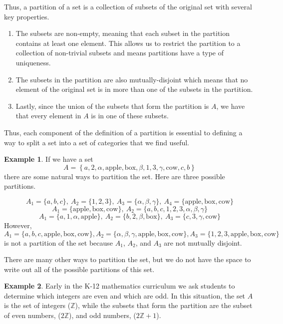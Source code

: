 \documentclass[
]{book}
\theoremstyle{definition}
\theoremstyle{definition}
\newtheorem{example}{Example}[chapter]
\theoremstyle{definition}
\theoremstyle{definition}
\theoremstyle{remark}
\begin{document}
Thus, a partition of a set is a collection of subsets of the original set with several key properties.

\begin{enumerate}
\def\labelenumi{\arabic{enumi}.}
\item
  The subsets are non-empty, meaning that each subset in the partition contains at least one element. This allows us to restrict the partition to a collection of non-trivial subsets and means partitions have a type of uniqueness.
\item
  The subsets in the partition are also mutually-disjoint which means that no element of the original set is in more than one of the subsets in the partition.
\item
  Lastly, since the union of the subsets that form the partition is \(A\), we have that every element in \(A\) is in one of these subsets.
\end{enumerate}

Thus, each component of the definition of a partition is essential to defining a way to split a set into a set of categories that we find useful.

\begin{example}
If we have a set
\[A=\left\{ a, 2, \alpha , \mbox{apple} , \mbox{box}, \beta, 1, 3, \gamma , \mbox{cow}, c, b \right\}\] there are some natural ways to partition the set. Here are three possible partitions.

\[A_1 = \{a,b,c\}, \: A_2 = \{1,2,3\},\: A_3 = \{\alpha, \beta, \gamma\}, \: A_4 = \{\mbox{apple} , \mbox{box}, \mbox{cow}\}\]
\[A_1 = \{\mbox{apple} , \mbox{box}, \mbox{cow}\}, \: A_2 = \{a,b,c,1,2,3,\alpha,\beta,\gamma\}\]
\[A_1 = \{a,1,\alpha,\mbox{apple}\}, \: A_2 = \{b,2,\beta,\mbox{box}\}, \: A_3 = \{c,3,\gamma, \mbox{cow} \}\]
However,
\[A_1=\{a,b,c, \mbox{apple}, \mbox{box}, \mbox{cow}\}, A_2=\{\alpha, \beta, \gamma, \mbox{apple},  \mbox{box}, \mbox{cow}\}, A_3=\{1,2,3, \mbox{apple}, \mbox{box}, \mbox{cow}\}\] is not a partition of the set because \(A_1\), \(A_2\), and \(A_3\) are not mutually disjoint.

There are many other ways to partition the set, but we do not have the space to write out all of the possible partitions of this set.
\end{example}

\begin{example}
Early in the K-12 mathematics curriculum we ask students to determine which integers are even and which are odd. In this situation, the set \(A\) is the set of integers (\(\mathbb{Z}\)), while the subsets that form the partition are the subset of even numbers, (\(2\mathbb{Z}\)), and odd numbers, (\(2\mathbb{Z}+1\)).
\end{example}
\end{document}
